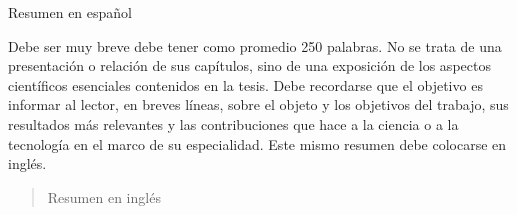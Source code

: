 \begin{resumen}
	Resumen en español
	
	Debe ser muy breve debe tener como promedio
	250 palabras.
	No se trata de una presentación o relación de sus
	capítulos, sino de una exposición de los aspectos
	científicos esenciales contenidos en la tesis.
	Debe recordarse que el objetivo es informar al
	lector, en breves líneas, sobre el objeto y los
	objetivos del trabajo, sus resultados más relevantes
	y las contribuciones que hace a la ciencia o a la
	tecnología en el marco de su especialidad.
	Este mismo resumen debe colocarse en inglés.
\end{resumen}

\begin{abstract}
	Resumen en inglés
\end{abstract}